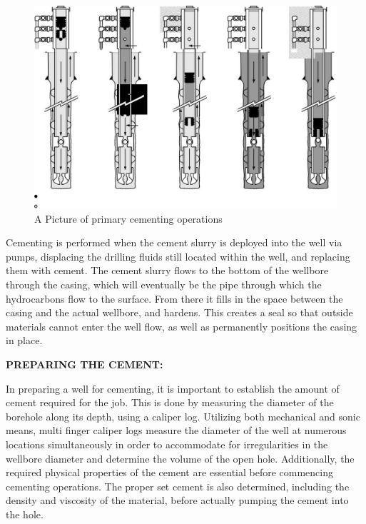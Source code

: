 \begin{figure}[h]
\includegraphics[scale=0.3]{images/primarycemtingoperation}
\centering 
\caption{A Picture of primary cementing operations}
\end{figure}

Cementing is performed when the cement slurry is deployed into the well via pumps,
displacing the drilling fluids still located within the well, and replacing them with cement.
The cement slurry flows to the bottom of the wellbore through the casing, 
which will eventually be the pipe through which the hydrocarbons flow to the surface. 
From there it fills in the space between the casing and the actual wellbore,
and hardens. This creates a seal so that outside materials cannot enter the well flow, as well as permanently positions the casing in place.



\textbf{PREPARING THE CEMENT:}

In preparing a well for cementing, it is important to establish the amount of cement required for the job.
This is done by measuring the diameter of the borehole along its depth, 
using a caliper log. Utilizing both mechanical and sonic means,
multi finger caliper logs measure the diameter of the well at numerous locations simultaneously in order to accommodate for irregularities in the wellbore diameter and determine the volume of the open hole.
Additionally, the required physical properties of the cement are essential before commencing 
cementing operations. The proper set cement is also determined, 
including the density and viscosity of the material, before actually pumping the cement into the hole.

\vspace{1em}

